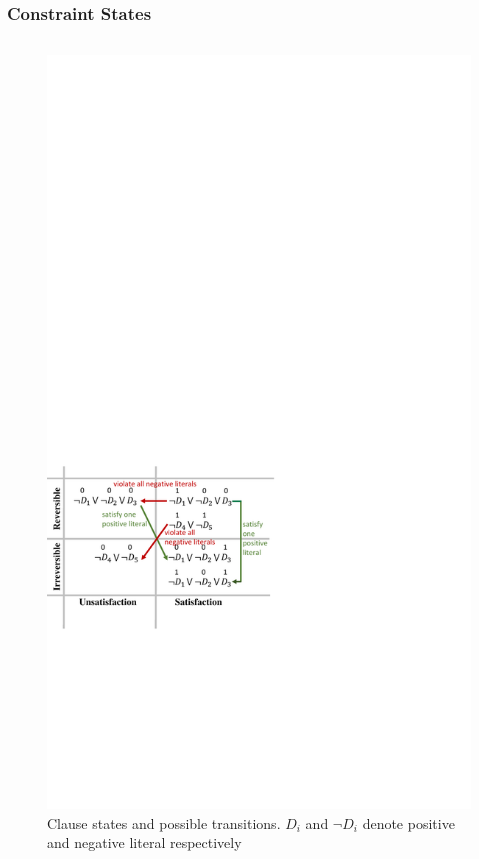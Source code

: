 \documentclass[10pt,aspectratio=43]{beamer}
\begin{document}
    \begin{frame}
        \frametitle{\textbf{Constraint States}}
        \begin{columns}[c]
            \begin{figure}
                \centering
                \includegraphics[width=1.3\textwidth]{figures/constrain_state.pdf}
                \caption{Clause states and possible transitions. $D_i$ and $\neg D_i$ denote positive and negative literal respectively}
                \label{fig:constrain_state}
            \end{figure}
            

\end{columns}
\end{frame}
\end{document}
